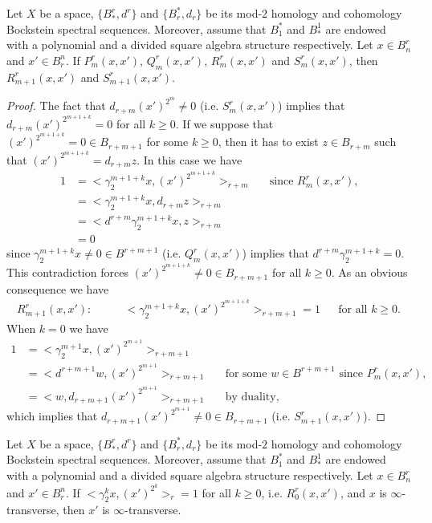 \begin{lem}\label{l:induction_step_transversity}
Let $X$ be a space, $\{B_*^r,d^r\}$ and $\{B^*_r,d_r\}$ be its mod-$2$ homology and cohomology Bockstein spectral sequences. Moreover, assume that $B^*_1$ and $B_*^1$ are endowed with a polynomial and a divided square algebra structure respectively. Let $x\in B^r_n$ and $x'\in B_r^n$. If $P^r_m(x,x')$, $Q^r_m(x,x')$, $R^r_m(x,x')$ and $S^r_m(x,x')$, then $R^r_{m+1}(x,x')$ and $S^r_{m+1}(x,x')$.
\end{lem}

\begin{proof}
The fact that $d_{r+m}(x')^{2^m}\not=0$ (i.e. $S^r_m(x,x')$) implies that $d_{r+m}(x')^{2^{m+1+k}}=0$ for all $k\geq0$. If we suppose that $(x')^{2^{m+1+k}}=0\in B_{r+m+1}$ for some $k\geq0$, then it has to exist $z\in B_{r+m}$ such that $(x')^{2^{m+1+k}}=d_{r+m}z$. In this case we have
\begin{align*}
1&=<\gamma_2^{m+1+k}x,(x')^{2^{m+1+k}}>_{r+m} &&\text{since $R^r_m(x,x')$,}\\
&=<\gamma_2^{m+1+k}x, d_{r+m}z>_{r+m}\\
&=<d^{r+m}\gamma_2^{m+1+k}x,z>_{r+m}\\
&=0
\end{align*} since $\gamma_2^{m+1+k}x\not=0\in B^{r+m+1}$ (i.e. $Q^r_m(x,x')$) implies that $d^{r+m}\gamma_2^{m+1+k}=0$. This contradiction forces $(x')^{2^{m+1+k}}\not=0\in B_{r+m+1}$ for all $k\geq0$. As an obvious consequence we have
\begin{align*}
R^r_{m+1}(x,x'):\qquad&<\gamma_2^{m+1+k}x,(x')^{2^{m+1+k}}>_{r+m+1}=1 &&\text{for all $k\geq0$.}
\end{align*}
When $k=0$ we have
\begin{align*}
1&=<\gamma_2^{m+1}x,(x')^{2^{m+1}}>_{r+m+1}\\
&=<d^{r+m+1}w,(x')^{2^{m+1}}>_{r+m+1} &&\text{for some $w\in B^{r+m+1}$ since $P^r_m(x,x')$,}\\
&=<w,d_{r+m+1}(x')^{2^{m+1}}>_{r+m+1} &&\text{by duality,}
\end{align*}
which implies that $d_{r+m+1}(x')^{2^{m+1}}\not=0\in B_{r+m+1}$ (i.e. $S^r_{m+1}(x,x')$).
\end{proof}

\begin{thm}\label{t:duality and transversity}
Let $X$ be a space, $\{B_*^r,d^r\}$ and $\{B^*_r,d_r\}$ be its mod-$2$ homology and cohomology Bockstein spectral sequences. Moreover, assume that $B^*_1$ and $B_*^1$ are endowed with a polynomial and a divided square algebra structure respectively. Let $x\in B^r_n$ and $x'\in B_r^n$. If $<\gamma_2^k x,(x')^{2^k}>_r=1$ for all $k\geq0$, i.e. $R^r_0(x,x')$, and $x$ is $\infty$-transverse, then $x'$ is $\infty$-transverse.
\end{thm}

